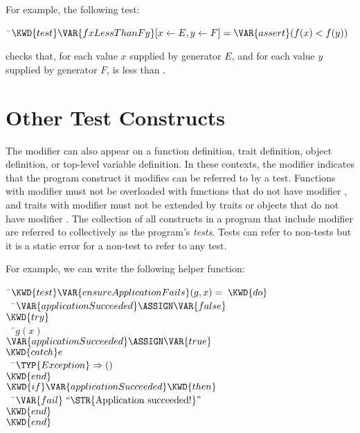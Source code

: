 For example, the following test:
\begin{Fortress}
{\tt~}\pushtabs\=\+\( \KWD{test} \VAR{fxLessThanFy}[{x \leftarrow E}, {y \leftarrow F}] = \VAR{assert} (f(x) < f(y))\)\-\\\poptabs
\end{Fortress}
checks that, for each value $x$ supplied by generator $E$,
and for each value $y$ supplied by generator $F$,
 is less than .


\section{Other Test Constructs}
The  modifier can also appear
on a function definition, trait definition, object definition,
or top-level variable definition. In these contexts, the modifier indicates
that the program construct it modifies can be referred to by a test.
Functions with modifier  must not be overloaded with
functions that do not have modifier , and
traits with modifier  must not be extended
by traits or objects that do not have modifier .
The collection of all constructs in a program that include modifier 
are referred to collectively as the program's \emph{tests}.
Tests can refer to non-tests but
it is a static error for a non-test to refer to any test.

For example, we can write the following helper function:
\begin{Fortress}
{\tt~}\pushtabs\=\+\( \KWD{test} \VAR{ensureApplicationFails}(g,x) = \;\KWD{do}\)\\
{\tt~~}\pushtabs\=\+\(   \VAR{applicationSucceeded} \ASSIGN \VAR{false}\)\\
\(   \KWD{try}\)\\
{\tt~~}\pushtabs\=\+\(     g(x)\)\\
\(     \VAR{applicationSucceeded} \ASSIGN \VAR{true}\)\-\\\poptabs
\(   \KWD{catch} e\)\\
{\tt~~}\pushtabs\=\+\(     \TYP{Exception} \Rightarrow ()\)\-\\\poptabs
\(   \KWD{end}\)\\
\(   \KWD{if} \VAR{applicationSucceeded} \KWD{then}\)\\
{\tt~~}\pushtabs\=\+\(     \VAR{fail}\;\hbox{\rm``\STR{Application~succeeded!}''}\)\-\\\poptabs
\(   \KWD{end}\)\-\\\poptabs
\( \KWD{end}\)\-\\\poptabs
\end{Fortress}


